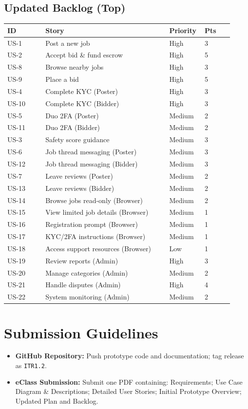 \documentclass[11pt]{article}
\begin{document}
\subsection{Updated Backlog (Top)}
\begin{longtable}{@{}p{0.16\linewidth} p{0.52\linewidth} p{0.12\linewidth} p{0.12\linewidth}@{}}
\toprule
\textbf{ID} & \textbf{Story} & \textbf{Priority} & \textbf{Pts} \\
\midrule
US-1 & Post a new job & High & 3 \\
US-2 & Accept bid \& fund escrow & High & 5 \\
US-8 & Browse nearby jobs & High & 3 \\
US-9 & Place a bid & High & 5 \\
US-4 & Complete KYC (Poster) & High & 3 \\
US-10 & Complete KYC (Bidder) & High & 3 \\
US-5 & Duo 2FA (Poster) & Medium & 2 \\
US-11 & Duo 2FA (Bidder) & Medium & 2 \\
US-3 & Safety score guidance & Medium & 3 \\
US-6 & Job thread messaging (Poster) & Medium & 3 \\
US-12 & Job thread messaging (Bidder) & Medium & 3 \\
US-7 & Leave reviews (Poster) & Medium & 2 \\
US-13 & Leave reviews (Bidder) & Medium & 2 \\
US-14 & Browse jobs read-only (Browser) & Medium & 2 \\
US-15 & View limited job details (Browser) & Medium & 1 \\
US-16 & Registration prompt (Browser) & Medium & 1 \\
US-17 & KYC/2FA instructions (Browser) & Medium & 1 \\
US-18 & Access support resources (Browser) & Low & 1 \\
US-19 & Review reports (Admin) & High & 3 \\
US-20 & Manage categories (Admin) & Medium & 2 \\
US-21 & Handle disputes (Admin) & High & 4 \\
US-22 & System monitoring (Admin) & Medium & 2 \\
\bottomrule
\end{longtable}

\section{Submission Guidelines}
\begin{itemize}[leftmargin=1.4em]
  \item \textbf{GitHub Repository:} Push prototype code and documentation; tag release as \texttt{ITR1.2}.
  \item \textbf{eClass Submission:} Submit one PDF containing: Requirements; Use Case Diagram \& Descriptions; Detailed User Stories; Initial Prototype Overview; Updated Plan and Backlog.
\end{itemize}
\end{document}
